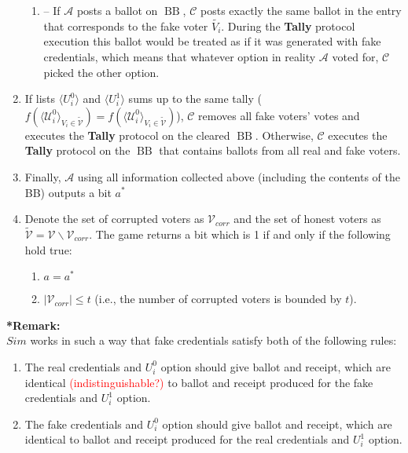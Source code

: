 \documentclass[12pt]{article}
\DeclareMathOperator{\bb}{BB}
\begin{document}
\begin{enumerate}
\begin{enumerate}
\item[] --  If  $\mathcal{A}$ posts a ballot on $\bb$, $\mathcal{C}$ posts exactly the same ballot in the entry that corresponds to the fake voter $\tilde{V_i}$. During the \textbf{Tally} protocol execution this ballot would be treated as if it was generated with fake credentials, which means that whatever option in reality $\mathcal{A}$ voted for, $\mathcal{C}$ picked the other option.  
\end{enumerate}
\item If lists $\langle U^0_i \rangle$ and $\langle U^1_i \rangle$ sums up to the same tally ( $f(\langle \mathcal{U}^0_i \rangle _{V_i \in \tilde{\mathcal{V}}} ) = f(\langle \mathcal{U}^0_i \rangle _{V_i \in \tilde{\mathcal{V}}})$), $\mathcal{C}$ removes all fake voters' votes and executes the \textbf{Tally} protocol on the cleared $\bb$. Otherwise, $\mathcal{C}$ executes the \textbf{Tally} protocol on the $\bb$ that contains ballots from all real and fake voters. 
\item Finally, $\mathcal{A}$ using all information collected above (including the contents of the BB) outputs a bit $a^*$
\item Denote the set of corrupted voters as $\mathcal{V}_{corr}$ and the set of honest voters as $\tilde{\mathcal{V}}= \mathcal{V} \backslash \mathcal{V}_{corr}$. The game returns a bit which is 1 if and only if the following hold true:
\begin{enumerate}
 \item $a = a^*$
 \item $|\mathcal{V}_{corr}| \leq t$ (i.e., the number of corrupted voters is bounded by $t$).
\end{enumerate} 
\end{enumerate}

\textbf{*Remark:}\\
$Sim$ works in such a way that fake credentials satisfy both of the following rules: 
\begin{enumerate}
 \item The real credentials and $U_i^0$ option  should give ballot and receipt, which are identical \textcolor{red}{ (indistinguishable?) } to ballot and receipt produced for the fake credentials and  $U_i^1$ option.
 \item The fake credentials and $U_i^0$ option  should give ballot and receipt, which are identical to ballot and receipt produced for the real credentials and  $U_i^1$ option.
 \end{enumerate}
\end{document}
